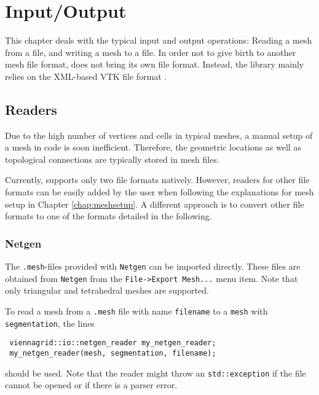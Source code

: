 \chapter{Input/Output} \label{chap:io}

This chapter deals with the typical input and output operations: Reading a mesh from a file, and writing a mesh to a file.
In order not to give birth to another mesh file format, {\ViennaGrid} does not bring its own file format. 
Instead, the library mainly relies on the XML-based VTK \cite{VTK} file format \cite{VTKfileformat}.




\section{Readers}
Due to the high number of vertices and cells in typical meshes,
a manual setup of a mesh in code is soon inefficient. Therefore,
the geometric locations as well as topological connections are typically stored in mesh files.

Currently, {\ViennaGrid} supports only two file formats natively. However, readers for other file formats
can be easily added by the user when following the explanations for mesh setup in Chapter \ref{chap:meshsetup}.
A different approach is to convert other file formats to one of the formats detailed in the following.


 \subsection{Netgen}
 The \texttt{.mesh}-files provided with \texttt{Netgen} \cite{netgen} can be imported directly.
 These files are obtained from \texttt{Netgen} from the \texttt{File->Export Mesh...} menu item. Note that only triangular and tetrahedral meshes are supported.

 To read a mesh from a \texttt{.mesh} file with name \lstinline|filename| to a \lstinline|mesh| with \lstinline|segmentation|, the lines
 \begin{lstlisting}
 viennagrid::io::netgen_reader my_netgen_reader;
 my_netgen_reader(mesh, segmentation, filename);
 \end{lstlisting}
 should be used. Note that the reader might throw an \lstinline|std::exception| if the file cannot be opened or if there is a parser error.

